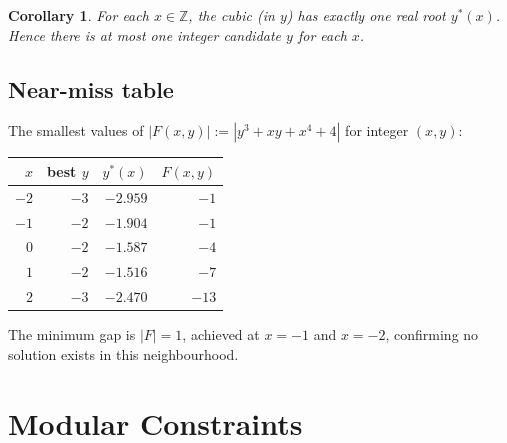 \documentclass[12pt, a4paper]{article}
\newtheorem{corollary}[theorem]{Corollary}
\theoremstyle{definition}
\newcommand{\Z}{\mathbb{Z}}
\begin{document}
\begin{corollary}
  For each $x\in\Z$, the cubic (in $y$) has exactly one real root $y^*(x)$.
  Hence there is at most one integer candidate $y$ for each $x$.
\end{corollary}

\subsection{Near-miss table}

The smallest values of $|F(x,y)| := |y^3+xy+x^4+4|$ for integer $(x,y)$:

\begin{center}
\begin{tabular}{rrrr}
\toprule
$x$ & best $y$ & $y^*(x)$ & $F(x,y)$ \\
\midrule
$-2$ & $-3$ & $-2.959$ & $-1$ \\
$-1$ & $-2$ & $-1.904$ & $-1$ \\
$0$  & $-2$ & $-1.587$ & $-4$ \\
$1$  & $-2$ & $-1.516$ & $-7$ \\
$2$  & $-3$ & $-2.470$ & $-13$ \\
\bottomrule
\end{tabular}
\end{center}

The minimum gap is $|F|=1$, achieved at $x=-1$ and $x=-2$, confirming no solution exists in this neighbourhood.

\section{Modular Constraints}
\end{document}

